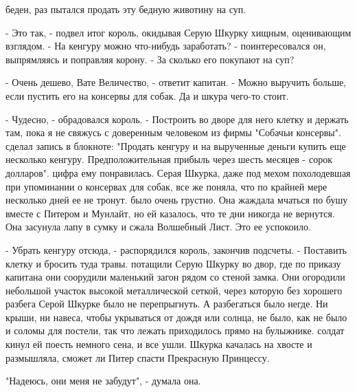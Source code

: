 беден, раз пытался продать эту бедную животину на суп.
\par- Это так, - подвел итог король, окидывая Серую Шкурку хищным, 
оценивающим взглядом. - На кенгуру можно что-нибудь заработать? - 
поинтересовался он, выпрямляясь и поправляя корону. - За сколько его 
покупают на суп?
\par- Очень дешево, Вате Величество, - ответит капитан. - Можно 
выручить больше, если пустить его на консервы для собак. Да и шкура 
чего-то стоит.
\par- Чудесно, - обрадовался король. - Построить во дворе для него 
клетку и держать там, пока я не свяжусь с доверенным человеком из 
фирмы "Собачьи консервы".
 сделал запись в блокноте: "Продать кенгуру и на вырученные 
деньги купить еще несколько кенгуру. Предположительная прибыль через 
шесть месяцев - сорок долларов".
 цифра ему понравилась. Серая Шкурка, даже под мехом 
похолодевшая при упоминании о консервах для собак, все же поняла, что 
по крайней мере несколько дней ее не тронут.
 было очень грустно. Она жаждала мчаться по бушу вместе с 
Питером и Мунлайт, но ей казалось, что те дни никогда не вернутся. Она 
засунула лапу в сумку и сжала Волшебный Лист. Это ее успокоило.
\par- Убрать кенгуру отсюда, - распорядился король, закончив подсчеты. 
- Поставить клетку и бросить туда травы.
 потащили Серую Шкурку во двор, где по приказу капитана они 
соорудили маленький загон рядом со стеной замка. Они огородили 
небольшой участок высокой металлической сеткой, через которую без 
хорошего разбега Серой Шкурке было не перепрыгнуть. А разбегаться было 
негде. Ни крыши, ни навеса, чтобы укрываться от дождя или солнца, не 
было, как не было и соломы для постели, так что лежать приходилось 
прямо на булыжнике.
 солдат кинул ей поесть немного сена, и все ушли.
 Шкурка качалась на хвосте и размышляла, сможет ли Питер 
спасти Прекрасную Принцессу.
\par"Надеюсь, они меня не забудут", - думала она.
\par
